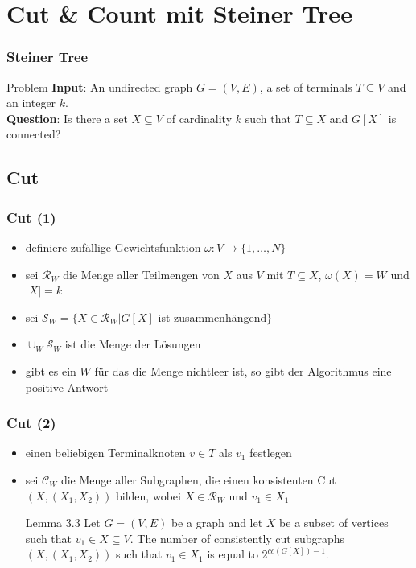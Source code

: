 \documentclass{beamer}
\begin{document}
\section{Cut \& Count mit Steiner Tree} %
\begin{frame}
\frametitle{Steiner Tree}
\begin{block}{Problem}
\textbf{Input}: An undirected graph $G = (V, E)$, a set of terminals $T \subseteq V$ and an integer $k$. \\
\textbf{Question}: Is there a set $X \subseteq V$ of cardinality $k$ such that $T \subseteq X$ and $G[X]$ is connected?
\end{block}
\end{frame}
\subsection{Cut}
\begin{frame}
\frametitle{Cut (1)}
\begin{itemize}
\item definiere zufällige Gewichtsfunktion $\omega:V\rightarrow \{1,\dots,N\}$ 
\item sei $\mathcal{R}_W$ die Menge aller Teilmengen von $X$ aus $V$ mit $T \subseteq X$, $\omega(X)=W$ und $|X|=k$
\item sei  $\mathcal{S}_W=\{X \in \mathcal{R}_W | G[X]$ ist zusammenhängend$\}$ 
\item $\cup_W \mathcal{S}_W$ ist die Menge der Lösungen
\item gibt es ein $W$ für das die Menge nichtleer ist, so gibt der Algorithmus eine positive Antwort
\end{itemize}
\end{frame}
\begin{frame}
\frametitle{Cut (2)}
\begin{itemize}
\item einen beliebigen Terminalknoten $v \in T$ als $v_1$ festlegen
\item sei $\mathcal{C}_W$ die Menge aller Subgraphen, die einen konsistenten Cut $(X,(X_1,X_2))$ bilden, wobei $X\in \mathcal{R}_W$ und $v_1 \in X_1$ 
\newline
\newline
\begin{block}{Lemma 3.3}
Let $G=(V,E)$ be a graph and let $X$ be a subset of vertices such that $v_1 \in X \subseteq V$. The number of
consistently cut subgraphs $(X,(X_1,X_2))$ such that $v_1 \in X_1$ is equal to $2^{cc(G[X])-1}$.
\end{block}
\end{itemize}
\end{frame}
\end{document}
